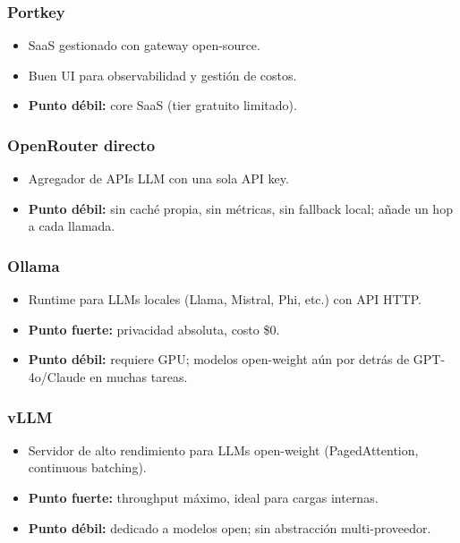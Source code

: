 \documentclass[11pt,a4paper]{article}
\begin{document}
\subsubsection{Portkey}
\begin{itemize}[leftmargin=*,itemsep=0pt]
\item SaaS gestionado con gateway open-source.
\item Buen UI para observabilidad y gestión de costos.
\item \textbf{Punto débil:} core SaaS (tier gratuito limitado).
\end{itemize}

\subsubsection{OpenRouter directo}
\begin{itemize}[leftmargin=*,itemsep=0pt]
\item Agregador de APIs LLM con una sola API key.
\item \textbf{Punto débil:} sin caché propia, sin métricas, sin fallback local; añade un hop a cada llamada.
\end{itemize}

\subsubsection{Ollama}
\begin{itemize}[leftmargin=*,itemsep=0pt]
\item Runtime para LLMs locales (Llama, Mistral, Phi, etc.) con API HTTP.
\item \textbf{Punto fuerte:} privacidad absoluta, costo \$0.
\item \textbf{Punto débil:} requiere GPU; modelos open-weight aún por detrás de GPT-4o/Claude en muchas tareas.
\end{itemize}

\subsubsection{vLLM}
\begin{itemize}[leftmargin=*,itemsep=0pt]
\item Servidor de alto rendimiento para LLMs open-weight (PagedAttention, continuous batching).
\item \textbf{Punto fuerte:} throughput máximo, ideal para cargas internas.
\item \textbf{Punto débil:} dedicado a modelos open; sin abstracción multi-proveedor.
\end{itemize}
\end{document}
